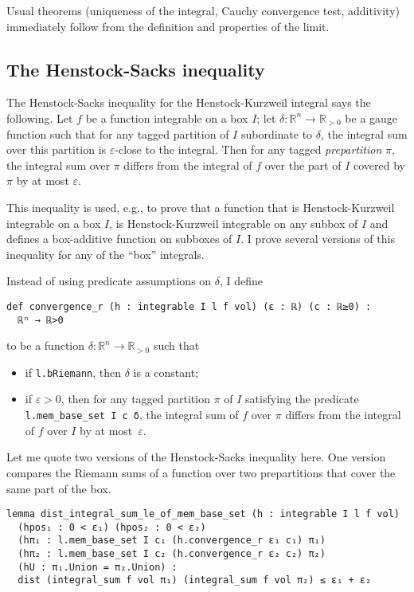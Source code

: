 \documentclass[a4paper, UKenglish,cleveref, autoref, thm-restate]{lipics-v2021}
\newcommand{\bbR}{\mathbb{R}}
\newcommand{\eps}{\varepsilon}
\begin{document}
Usual theorems (uniqueness of the integral, Cauchy convergence test,
additivity) immediately follow from the definition and properties of
the limit.

\subsection{The Henstock-Sacks inequality}%
\label{sec:henst-sacks-ineq}

The Henstock-Sacks inequality for the Henstock-Kurzweil integral says
the following. Let \(f\) be a function integrable on a box \(I\); let
\(\delta\colon \bbR^{n} \to \bbR_{>0}\) be a gauge function such that
for any tagged partition of \(I\) subordinate to \(\delta\), the
integral sum over this partition is \(\eps\)-close to the
integral. Then for any tagged \emph{prepartition} \(\pi\), the
integral sum over \(\pi\) differs from the integral of \(f\) over the
part of \(I\) covered by \(\pi\) by at most \(\eps\).

This inequality is used, e.g., to prove that a function that is
Henstock-Kurzweil integrable on a box \(I\), is Henstock-Kurzweil
integrable on any subbox of \(I\) and defines a box-additive function
on subboxes of \(I\). I prove several versions of this inequality for
any of the \enquote{box} integrals.

Instead of using predicate assumptions on \(\delta\), I define
\begin{lstlisting}
def convergence_r (h : integrable I l f vol) (ε : ℝ) (c : ℝ≥0) :
  ℝⁿ → ℝ>0
\end{lstlisting}
to be a function \(\delta\colon\mathbb R^{n}\to\mathbb R_{>0}\) such
that
\begin{itemize}
\item if \lstinline=l.bRiemann=, then \(\delta\) is a constant;
\item if \(\eps > 0\), then for any tagged partition \(\pi\) of \(I\)
  satisfying the predicate \lstinline=l.mem_base_set I c δ=, the
  integral sum of \(f\) over \(\pi\) differs from the integral of
  \(f\) over \(I\) by at most~\(\eps\).
\end{itemize}

Let me quote two versions of the Henstock-Sacks inequality here. One
version compares the Riemann sums of a function over two prepartitions
that cover the same part of the box.
\begin{lstlisting}
lemma dist_integral_sum_le_of_mem_base_set (h : integrable I l f vol)
  (hpos₁ : 0 < ε₁) (hpos₂ : 0 < ε₂)
  (hπ₁ : l.mem_base_set I c₁ (h.convergence_r ε₁ c₁) π₁)
  (hπ₂ : l.mem_base_set I c₂ (h.convergence_r ε₂ c₂) π₂)
  (hU : π₁.Union = π₂.Union) :
  dist (integral_sum f vol π₁) (integral_sum f vol π₂) ≤ ε₁ + ε₂
\end{lstlisting}
\end{document}
